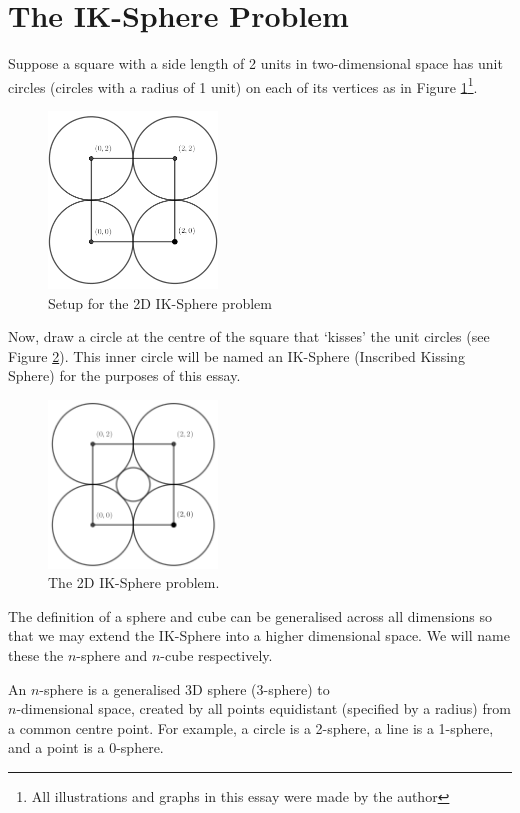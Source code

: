 \section{The IK-Sphere Problem}
Suppose a square with a side length of 2 units in two-dimensional space has unit circles (circles with a radius of 1 unit) on each of its vertices as in Figure \ref{fig:2d_Setup_IK_Sphere}\footnote{All illustrations and graphs in this essay were made by the author}.
\begin{figure}[H]
    \centering
    \includegraphics[width=0.4\textwidth]{images/2D.png}
    \caption{\label{fig:2d_Setup_IK_Sphere}Setup for the 2D IK-Sphere problem}
\end{figure}
Now, draw a circle at the centre of the square that `kisses' the unit circles (see Figure \ref{fig:2d_IK_Sphere}). This inner circle will be named an IK-Sphere (Inscribed Kissing Sphere) for the purposes of this essay.
\begin{figure}[H]
    \centering
    \includegraphics[width=0.4\textwidth]{images/2D IK.png}
    \caption{\label{fig:2d_IK_Sphere}The 2D IK-Sphere problem.}
\end{figure}
The definition of a sphere and cube can be generalised across all dimensions so that we may extend the IK-Sphere into a higher dimensional space. We will name these the $n$-sphere and $n$-cube respectively.

\begin{definition}[$n$-Sphere]\label{def:n-sphere}
    An $n$-sphere is a generalised 3D sphere (3-sphere) to \\$n$-dimensional space, created by all points equidistant (specified by a radius) from a common centre point. For example, a circle is a 2-sphere, a line is a 1-sphere, and a point is a 0-sphere.
\end{definition}


